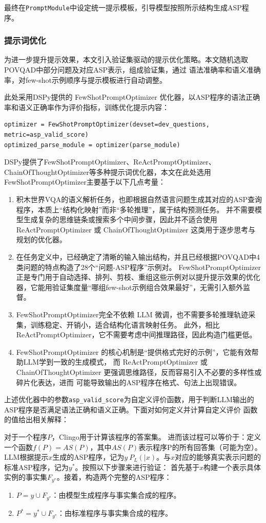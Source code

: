 最终在\texttt{PromptModule}中设定统一提示模板，引导模型按照所示结构生成ASP程序。
\subsubsection{提示词优化}
为进一步提升提示效果，本文引入验证集驱动的提示优化策略。本文随机选取POVQAD中部分问题及对应ASP表示，组成验证集，通过
语法准确率和语义准确率，对few-shot示例顺序与提示模板进行自动调整。

此处采用DSPy提供的 FewShotPromptOptimizer 优化器，以ASP程序的语法正确率和语义正确率作为评价指标，训练优化提示内容：
\begin{lstlisting}
optimizer = FewShotPromptOptimizer(devset=dev_questions, metric=asp_valid_score)
optimized_parse_module = optimizer(parse_module)
\end{lstlisting}

DSPy提供了FewShotPromptOptimizer、ReActPromptOptimizer、ChainOfThoughtOptimizer等多种提示词优化器，本文在此处选用
FewShotPromptOptimizer主要基于以下几点考量：
\begin{enumerate}[nosep]
\item 积木世界VQA的语义解析任务，也即根据自然语言问题生成其对应的ASP查询程序，本质上“结构化映射”而非“多轮推理”，属于结构预测任务。
并不需要模型生成复杂的思维链条或搜索多个中间步骤，因此并不适合使用 ReActPromptOptimizer 或 ChainOfThoughtOptimizer 这类用于逐步思考与规划的优化器。
\item 在任务定义中，已经确定了清晰的输入输出结构，并且已经根据POVQAD中4类问题的特点构造了28个“问题-ASP程序”示例对。
FewShotPromptOptimizer 正是专门用于自动选择、排列、剪枝、重组这些示例对以提升提示效果的优化器，它能用验证集度量“哪组few-shot示例组合效果最好”，无需引入额外监督。
\item FewShotPromptOptimizer完全不依赖 LLM 微调，也不需要多轮推理轨迹采集，训练稳定、开销小，适合结构化语言映射任务。
此外，相比 ReActPromptOptimizer，它不需要考虑中间推理路径，因此构造门槛更低。
\item FewShotPromptOptimizer 的核心机制是“提供格式完好的示例”，它能有效帮助LLM学到一致的生成模式，
而 ReActPromptOptimizer 或 ChainOfThoughtOptimizer 更强调思维路径，反而容易引入不必要的多样性或碎片化表达，进而
可能导致输出的ASP程序在格式、句法上出现错误。
\end{enumerate}

上述优化器中的参数\texttt{asp\_valid\_score}为自定义评价函数，用于判断LLM输出的ASP程序是否满足语法正确和语义正确。下面对如何定义并计算自定义评价
函数的值给出相关解释：

对于一个程序$P$，Clingo用于计算该程序的答案集。
进而该过程可以等价于：定义一个函数$f(P) = AS(P)$，其中$AS(P)$表示程序P的所有回答集（可能为空）。
LLM根据提示$x$生成的ASP程序，记为$y ~ P_L(|x)$。与$x$对应的能够真实表示问题的标准ASP程序，记为$y^*$。按照以下步骤来进行验证：
首先基于$x$构建一个表示具体实例的事实集$F_{y^*}$。接着，构造两个完整的ASP程序：
\begin{enumerate}[nosep]
\item $P = y \cup F_{y^*}$：由模型生成程序与事实集合成的程序。
\item $P^* = y^* \cup F_{y^*}$：由标准程序与事实集合成的程序。
\end{enumerate}


